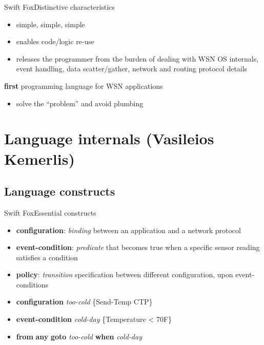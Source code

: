 \documentclass{beamer}
\begin{document}
\begin{frame}{Swift Fox}{Distinctive characteristics}
	\begin{itemize}
	\item simple, simple, simple
	\item enables code/logic re-use
	\item releases the programmer from the burden of dealing with WSN
	OS internals, event handling, data scatter/gather, network and
	routing protocol details
	\end{itemize}
	\begin{block}{\textbf{first} programming language for WSN
	applications}
		\begin{itemize}
		\item solve the ``problem'' and avoid plumbing
		\end{itemize}
	\end{block}
\end{frame}


\section[Language internals]{Language internals (Vasileios Kemerlis)}

\subsection[Constructs]{Language constructs}

\begin{frame}{Swift Fox}{Essential constructs}
	\begin{itemize}
	\item \textbf{configuration}: \textit{binding} between an
	application and a network protocol
	\item \textbf{event-condition}: \textit{predicate} that becomes
	true when a specific sensor reading satisfies a condition
	\item \textbf{policy}: \textit{transition} specification between
	different configuration, upon event-conditions
	\end{itemize}
	\begin{example}
		\begin{itemize}
		\item \textbf{configuration} \textit{too-cold}
		\{Send-Temp CTP\}
		\item \textbf{event-condition} \textit{cold-day}
		\{Temperature < 70F\}
		\item \textbf{from} \textbf{any} \textbf{goto}
		\textit{too-cold} \textbf{when} \textit{cold-day}
		\end{itemize}
	\end{example}
\end{frame}
\end{document}

